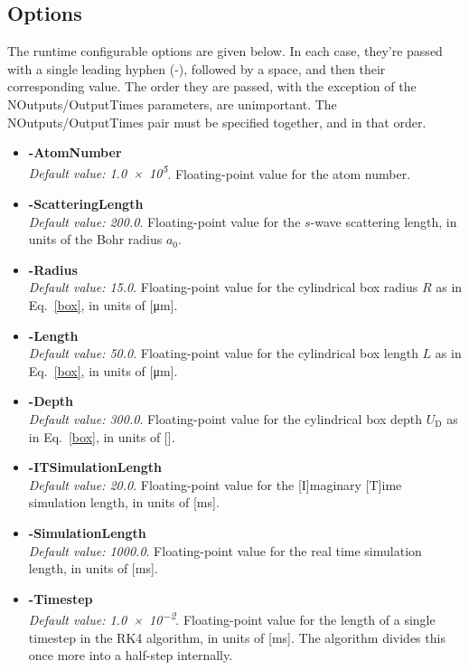 \documentclass{jakedoc}
\begin{document}
\subsection{Options}
The runtime configurable options are given below. In each case, they're passed with a single leading hyphen (-), followed by a space, and then their corresponding value. The order they are passed, with the exception of the NOutputs/OutputTimes parameters, are unimportant. The NOutputs/OutputTimes pair must be specified together, and in that order.
\begin{itemize}
	\item \textbf{-AtomNumber}\\
	\emph{Default value: \num{1.0e5}}. Floating-point value for the atom number. 
	
	\item \textbf{-ScatteringLength}\\
	\emph{Default value: \num{200.0}}. Floating-point value for the $s$-wave scattering length, in units of the Bohr radius $a_0$. 
	
	\item \textbf{-Radius}\\
	\emph{Default value: \num{15.0}}. Floating-point value for the cylindrical box radius $R$ as in Eq.~\eqref{box}, in units of [\si{\um}]. 
	
	\item \textbf{-Length}\\
	\emph{Default value: \num{50.0}}. Floating-point value for the cylindrical box length $L$ as in Eq.~\eqref{box}, in units of [\si{\um}].
	
	\item \textbf{-Depth}\\
	\emph{Default value: \num{300.0}}. Floating-point value for the cylindrical box depth $U_{\text{D}}$ as in Eq.~\eqref{box}, in units of [\si{\nK}].
	
	\item \textbf{-ITSimulationLength}\\
	\emph{Default value: \num{20.0}}. Floating-point value for the [I]maginary [T]ime simulation length, in units of [\si{\milli\second}].
	
	\item \textbf{-SimulationLength}\\
	\emph{Default value: 1000.0}. Floating-point value for the real time simulation length, in units of [\si{\milli\second}].
	
	\item \textbf{-Timestep}\\
	\emph{Default value: \num{1.0e-2}}. 
	Floating-point value for the length of a single timestep in the RK4 algorithm, in units of [\si{\milli\second}]. 
	The algorithm divides this once more into a half-step internally. 
	

\end{itemize}
\end{document}

